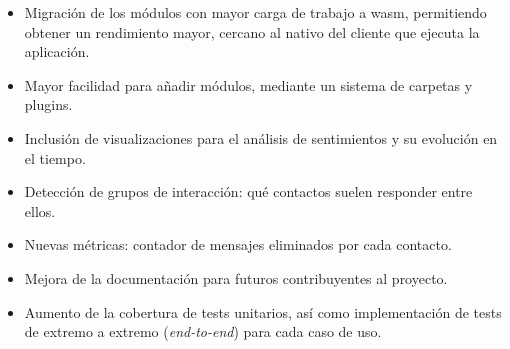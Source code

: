 \begin{itemize}

\item Migración de los módulos con mayor carga de trabajo a \acrfull{wasm}, permitiendo obtener un rendimiento mayor, cercano al nativo del cliente que ejecuta la aplicación.

\item Mayor facilidad para añadir módulos, mediante un sistema de carpetas y plugins.

\item Inclusión de visualizaciones para el análisis de sentimientos y su evolución en el tiempo.

\item Detección de grupos de interacción: qué contactos suelen responder entre ellos.

\item Nuevas métricas: contador de mensajes eliminados por cada contacto.

\item Mejora de la documentación para futuros contribuyentes al proyecto.

\item Aumento de la cobertura de tests unitarios, así como implementación de tests de extremo a extremo (\textit{end-to-end}) para cada caso de uso.

\end{itemize}
